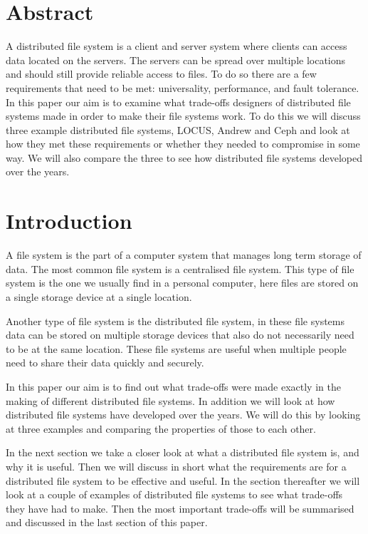 \documentclass[a4paper,12px]{article}
\begin{document}
\clearpage
\vspace*{0.5cm}
\tableofcontents
\clearpage




\section{Abstract}

A distributed file system is a client and server system where clients can access
data located on the servers. The servers can be spread over multiple locations
and should still provide reliable access to files. To do so there are a few
requirements that need to be met: universality, performance, and fault
tolerance.  In this paper our aim is to examine what trade-offs designers of
distributed file systems made in order to make their file systems work. To do
this we will discuss three example distributed file systems, LOCUS, Andrew and
Ceph and look at how they met these requirements or whether they needed to
compromise in some way. We will also compare the three to see how distributed
file systems developed over the years.

\section{Introduction}

A file system is the part of a computer system that manages long term storage of
data.  The most common file system is a centralised file system. This type of
file system is the one we usually find in a personal computer, here files are
stored on a single storage device at a single location.

Another type of file system is the distributed file system, in these file
systems data can be stored on multiple storage devices that also do not
necessarily need to be at the same location. These file systems are useful when
multiple people need to share their data quickly and securely.

In this paper our aim is to find out what trade-offs were made exactly in the
making of different distributed file systems. In addition we will look at how
distributed file systems have developed over the years. We will do this by
looking at three examples and comparing the properties of those to each other.

In the next section we take a closer look at what a distributed file system is,
and why it is useful. Then we will discuss in short what the requirements are
for a distributed file system to be effective and useful. In the section
thereafter we will look at a couple of examples of distributed file systems to
see what trade-offs they have had to make. Then the most important trade-offs
will be summarised and discussed in the last section of this paper.
\end{document}
